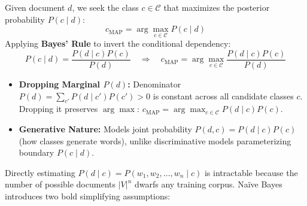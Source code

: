 \documentclass[10pt,a4paper]{article}
\begin{document}
\vspace{-2pt}

\par\vspace{1pt}
Given document $d$, we seek the class $c \in \mathcal{C}$ that maximizes the posterior probability $P(c \mid d)$:
\[
c_{\text{MAP}} = \arg\max_{c \in \mathcal{C}} P(c \mid d)
\]
Applying \textbf{Bayes' Rule} to invert the conditional dependency:
\[
P(c \mid d) = \frac{P(d \mid c) P(c)}{P(d)} \quad \Longrightarrow \quad c_{\text{MAP}} = \arg\max_{c \in \mathcal{C}} \frac{P(d \mid c) P(c)}{P(d)}
\]
\begin{itemize}[leftmargin=12pt, itemsep=0.5pt, parsep=0pt, topsep=0.5pt]
    \item \textbf{Dropping Marginal $P(d)$:} Denominator $P(d) = \sum_{c'} P(d \mid c') P(c') > 0$ is constant across all candidate classes $c$. Dropping it preserves $\arg\max$: $c_{\text{MAP}} = \arg\max_{c \in \mathcal{C}} P(d \mid c) P(c)$.
    \item \textbf{Generative Nature:} Models joint probability $P(d, c) = P(d \mid c)P(c)$ (how classes generate words), unlike discriminative models parameterizing boundary $P(c \mid d)$.
\end{itemize}

\vspace{-2pt}

\par\vspace{1pt}
Directly estimating $P(d \mid c) = P(w_1, w_2, \dots, w_n \mid c)$ is intractable because the number of possible documents $|V|^n$ dwarfs any training corpus. Naïve Bayes introduces two bold simplifying assumptions:

\vspace{1pt}
\end{document}
